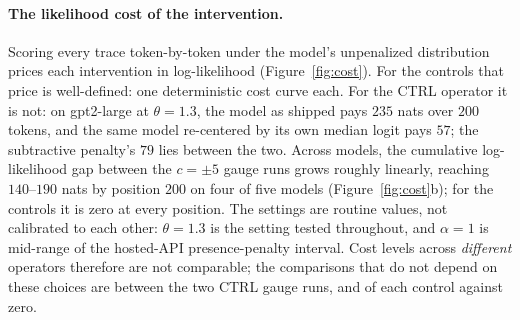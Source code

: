 \documentclass[11pt]{article}
\newcommand{\thp}{\theta}
\begin{document}
\paragraph{The likelihood cost of the intervention.} Scoring every trace
token-by-token under the model's unpenalized distribution prices each intervention in
log-likelihood (Figure~\ref{fig:cost}). For
the controls that price is well-defined: one deterministic cost curve each. For
the CTRL operator it is not: on gpt2-large at $\thp=1.3$, the model as shipped pays $235$ nats
over $200$ tokens, and the same model re-centered by its own median logit pays $57$; the
subtractive penalty's $79$ lies between the two. Across models, the cumulative
log-likelihood gap between the $c=\pm5$ gauge runs grows roughly linearly, reaching $140$--$190$
nats by position $200$ on four of five models (Figure~\ref{fig:cost}b); for the controls it is
zero at every position. The settings are routine values, not calibrated to each other:
$\thp=1.3$ is the setting tested throughout, and $\alpha=1$ is mid-range of the hosted-API
presence-penalty interval. Cost levels across \emph{different} operators therefore are not
comparable; the comparisons that do not depend on these choices are between the two CTRL gauge
runs, and of each control against zero.
\end{document}
